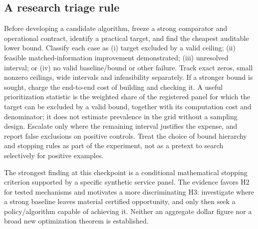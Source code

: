 \documentclass[11pt,letterpaper]{article}
\begin{document}
\subsection{A research triage rule}
Before developing a candidate algorithm, freeze a strong comparator and operational contract, identify a practical target, and find the cheapest auditable lower bound. Classify each case as (i) target excluded by a valid ceiling; (ii) feasible matched-information improvement demonstrated; (iii) unresolved interval; or (iv) no valid baseline/bound or other failure. Track exact zeros, small nonzero ceilings, wide intervals and infeasibility separately. If a stronger bound is sought, charge the end-to-end cost of building and checking it. A useful prioritization statistic is the weighted share of the registered panel for which the target can be excluded by a valid bound, together with its computation cost and denominator; it does not estimate prevalence in the grid without a sampling design. Escalate only where the remaining interval justifies the expense, and report false exclusions on positive controls. Treat the choice of bound hierarchy and stopping rules as part of the experiment, not as a pretext to search selectively for positive examples.

The strongest finding at this checkpoint is a conditional mathematical stopping criterion supported by a specific synthetic service panel. The evidence favors H2 for tested mechanisms and motivates a more discriminating H3: investigate where a strong baseline leaves material certified opportunity, and only then seek a policy/algorithm capable of achieving it. Neither an aggregate dollar figure nor a broad new optimization theorem is established.
\end{document}

